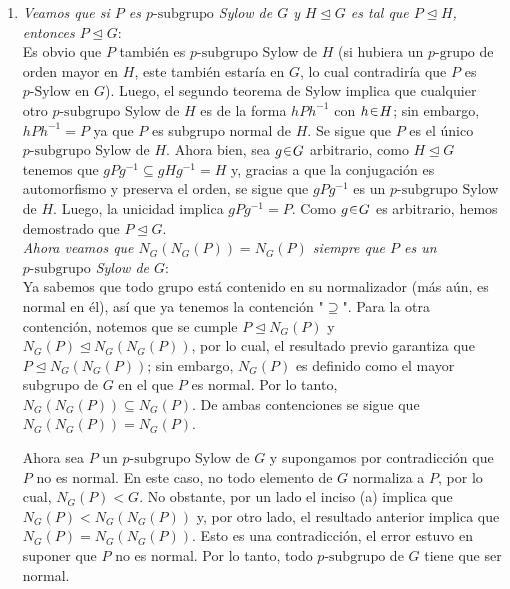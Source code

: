 \begin{sol}[Demostración]
\begin{enumerate}[label = (\alph*)]
    \item \emph{Veamos que si $P$ es $p\text{-subgrupo}$ Sylow de $G$ y $H \trianglelefteq G$ es tal que $P \trianglelefteq H$, entonces $P \trianglelefteq G$}:\\
    Es obvio que $P$ también es $p\text{-subgrupo}$ Sylow de $H$ (si hubiera un $p\text{-grupo}$ de orden mayor en $H$, este también estaría en $G$, lo cual contradiría que $P$ es $p\text{-Sylow}$ en $G$). Luego, el segundo teorema de Sylow implica que cualquier otro $p\text{-subgrupo}$ Sylow de $H$ es de la forma $hPh^{-1}$ con $h \en H$; sin embargo, $hPh^{-1} = P$ ya que $P$ es subgrupo normal de $H$. Se sigue que $P$ es el único $p\text{-subgrupo}$ Sylow de $H$. Ahora bien, sea $g \en G$ arbitrario, como $H \trianglelefteq G$ tenemos que $gPg^{-1} \subseteq gHg^{-1} = H$ y, gracias a que la conjugación es automorfismo y preserva el orden, se sigue que $gPg^{-1}$ es un $p\text{-subgrupo}$ Sylow de $H$. Luego, la unicidad implica $gPg^{-1} = P$. Como $g \en G$ es arbitrario, hemos demostrado que $P \trianglelefteq G$.\vspace{1em}\\
    \emph{Ahora veamos que $N_G(N_G(P)) = N_G(P)$ siempre que $P$ es un $p\text{-subgrupo}$ Sylow de $G$}:\\
    Ya sabemos que todo grupo está contenido en su normalizador (más aún, es normal en él), así que ya tenemos la contención "$\supseteq$". Para la otra contención, notemos que se cumple $P \trianglelefteq N_G(P)$ y $N_G(P) \trianglelefteq N_G(N_G(P))$, por lo cual, el resultado previo garantiza que $P \trianglelefteq N_G(N_G(P))$; sin embargo, $N_G(P)$ es definido como el mayor subgrupo de $G$ en el que $P$ es normal. Por lo tanto, $N_G(N_G(P)) \subseteq N_G(P)$. De ambas contenciones se sigue que $N_G(N_G(P)) = N_G(P)$.\par\vspace{1em}
    Ahora sea $P$ un $p\text{-subgrupo}$ Sylow de $G$ y supongamos por contradicción que $P$ no es normal. En este caso, no todo elemento de $G$ normaliza a $P$, por lo cual, $N_G(P) < G$. No obstante, por un lado el inciso (a) implica que $N_G(P) < N_G(N_G(P))$ y, por otro lado, el resultado anterior implica que $N_G(P) = N_G(N_G(P))$. Esto es una contradicción, el error estuvo en suponer que $P$ no es normal. Por lo tanto, todo $p\text{-subgrupo}$ de $G$ tiene que ser normal.
\end{enumerate}
\end{sol}